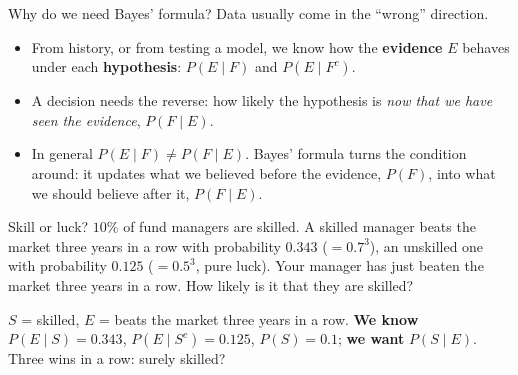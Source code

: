 \documentclass[aspectratio=169,11pt,usepdftitle=false]{beamer}
\begin{document}
\begin{frame}{Why do we need Bayes' formula?}
  \small
  Data usually come in the ``wrong'' direction.
  \begin{itemize}
    \item From history, or from testing a model, we know how the
          \textbf{evidence} $E$ behaves under each \textbf{hypothesis}:
          $P(E\mid F)$ and $P(E\mid F^c)$.
    \item A decision needs the reverse: how likely the hypothesis is
          \emph{now that we have seen the evidence}, $P(F\mid E)$.
    \item In general $P(E\mid F)\neq P(F\mid E)$. Bayes' formula turns the
          condition around: it updates what we believed before the evidence,
          $P(F)$, into what we should believe after it, $P(F\mid E)$.
  \end{itemize}
  \pause
  \begin{exampleblock}{Skill or luck?}
    $10\%$ of fund managers are skilled. A skilled manager beats the market
    three years in a row with probability $0.343$ ($=0.7^3$), an unskilled
    one with probability $0.125$ ($=0.5^3$, pure luck). Your manager has
    just beaten the market three years in a row. How likely is it that they
    are skilled?
  \end{exampleblock}
  \pause
  $S$ = skilled, $E$ = beats the market three years in a row.
  \textbf{We know} $P(E\mid S)=0.343$, $P(E\mid S^c)=0.125$, $P(S)=0.1$;
  \textbf{we want} $P(S\mid E)$. Three wins in a row: surely skilled?
\end{frame}
\end{document}
